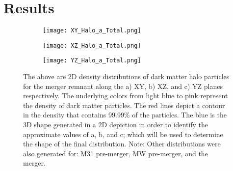\documentclass{aastex63}
\begin{document}
\section{Results}

\begin{figure}[ht!]
\centering
\begin{subfigure}{0.3\textwidth}
\centering
\texttt{[image: XY\_Halo\_a\_Total.png]}
\caption{\label{fig:5a}}
\end{subfigure}
\begin{subfigure}{0.3\textwidth}
\texttt{[image: XZ\_Halo\_a\_Total.png]}
\caption{\label{fig:5b}}
\end{subfigure}
\begin{subfigure}{0.3\textwidth}
\texttt{[image: YZ\_Halo\_a\_Total.png]}
\caption{\label{fig:5c}}
\end{subfigure}
\caption{The above are 2D density distributions of dark matter halo particles for the merger remnant along the a) XY, b) XZ, and c) YZ planes respectively. The underlying colors from light blue to pink represent the density of dark matter particles. The red lines depict a contour in the density that contains 99.99\% of the particles. The blue is the 3D shape generated in a 2D depiction in order to identify the approximate values of a, b, and c; which will be used to determine the shape of the final distribution.
Note: Other distributions were also generated for: M31 pre-merger, MW pre-merger, and the merger.}
\centering
\end{figure}
\end{document}
